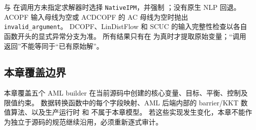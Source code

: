 与  在调用方未指定求解器时选择
\texttt{NativeIPM}，并强制 ；没有原生 NLP 回退。
ACOPF 输入母线为空或 ACDCOPF 的 AC 母线为空时抛出 \texttt{invalid\_argument}。
DCOPF、LinDistFlow 和 SCUC 的输入完整性检查以各自函数开头的显式异常分支为准。
所有结果只有在  为真时才提取原始变量；“调用返回”不能等同于“已有原始解”。

\subsection{本章覆盖边界}

本章覆盖五个 AML builder 在当前源码中创建的核心变量、目标、平衡、控制及限值约束。
数据转换函数中的每个字段映射、AML 后端内部的 barrier/KKT 数值算法、以及生产运行时
 和  不属于本章模型。
若这些实现发生变化，本章不能作为独立于源码的规范继续沿用，必须重新逐式审计。
